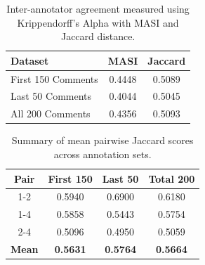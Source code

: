 \documentclass[
10pt, %
a4paper, %
oneside, %
headinclude,footinclude, %
] {book}%
\begin{document}
\begin{table}[htbp]
\centering
\begin{tabular}{lcc}
\toprule
\textbf{Dataset} & \textbf{MASI} & \textbf{Jaccard} \\
\midrule
First 150 Comments & 0.4448 & 0.5089 \\
Last 50 Comments & 0.4044 & 0.5045 \\
All 200 Comments & 0.4356 & 0.5093 \\
\bottomrule
\end{tabular}
\caption{Inter-annotator agreement measured using Krippendorff's Alpha with MASI and Jaccard distance.}
\label{tab:pre_masi_jaccard}
\end{table}

\begin{table}[htbp]
    \centering
    \begin{tabular}{cccc}
        \textbf{Pair} & \textbf{First 150} & \textbf{Last 50} & \textbf{Total 200} \\
        \hline
        1-2 & 0.5940 & 0.6900 & 0.6180 \\
        1-4 & 0.5858 & 0.5443 & 0.5754 \\
        2-4 & 0.5096 & 0.4950 & 0.5059 \\
        \hline
        \textbf{Mean} & \textbf{0.5631} & \textbf{0.5764} & \textbf{0.5664} \\
    \end{tabular}
    \caption{Summary of mean pairwise Jaccard scores across annotation sets.}
    \label{tab:pair_jaccard_summary}
\end{table}
\end{document}
